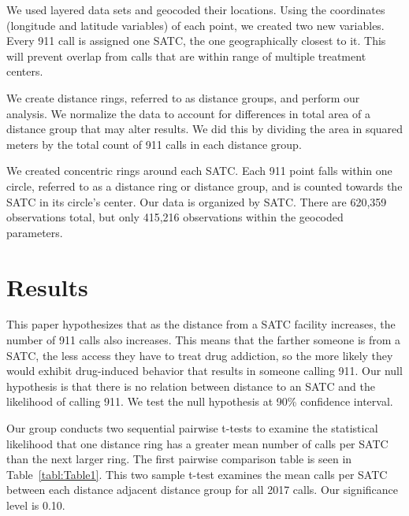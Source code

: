 \documentclass[12pt]{article}
\begin{document}
We used layered data sets and geocoded their locations. Using the coordinates (longitude and latitude variables) of each point, we created two new variables. Every 911 call is assigned one SATC, the one geographically closest to it. This will prevent overlap from calls that are within range of multiple treatment centers.

We create distance rings, referred to as distance groups, and perform our analysis. We normalize the data to account for differences in total area of a distance group that may alter results. We did this by dividing the area in squared meters by the total count of 911 calls in each distance group.

We created concentric rings around each SATC. Each 911 point falls within one circle, referred to as a distance ring or distance group, and is counted towards the SATC in its circle's center. Our data is organized by SATC. There are 620,359 observations total, but only 415,216 observations within the geocoded parameters.


\section{Results}
\label{sec:result}

This paper hypothesizes that as the distance from a SATC facility increases, the number of 911 calls also increases. This means that the farther someone is from a SATC, the less access they have to treat drug addiction, so the more likely they would exhibit drug-induced behavior that results in someone calling 911. Our null hypothesis is that there is no relation between distance to an SATC and the likelihood of calling 911. We test the null hypothesis at 90\% confidence interval. 

Our group conducts two sequential pairwise t-tests to examine the statistical likelihood that one distance ring has a greater mean number of calls per SATC than the next larger ring. The first pairwise comparison table is seen in Table~\ref{tabl:Table1}. This two sample t-test examines the mean calls per SATC between each distance adjacent distance group for all 2017 calls. Our significance level is 0.10.
\end{document}
